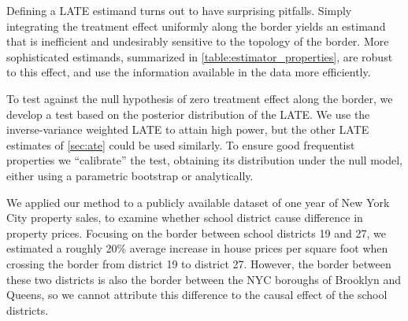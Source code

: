 \documentclass[12pt]{article}
\begin{document}
Defining a LATE estimand turns out to have surprising pitfalls.
Simply integrating the treatment effect uniformly along the border yields an estimand that is inefficient and undesirably sensitive to the topology of the border.
More sophisticated estimands, summarized in \autoref{table:estimator_properties}, are robust to this effect, and use the information available in the data more efficiently.

To test against the null hypothesis of zero treatment effect along the border, we develop a test based on the posterior distribution of the LATE.
We use the inverse-variance weighted LATE to attain high power, but the other LATE estimates of \autoref{sec:ate} could be used similarly.
To ensure good frequentist properties we “calibrate” the test, obtaining its distribution under the null model, either using a parametric bootstrap or analytically.

We applied our method to a publicly available dataset of one year of New York City property sales, to examine whether school district cause difference in property prices.
Focusing on the border between school districts 19 and 27, we estimated a roughly 20\% average increase in house prices per square foot when crossing the border from district 19 to district 27.
However, the border between these two districts is also the border between the NYC boroughs of Brooklyn and Queens, so we cannot attribute this difference to the causal effect of the school districts.
\end{document}
